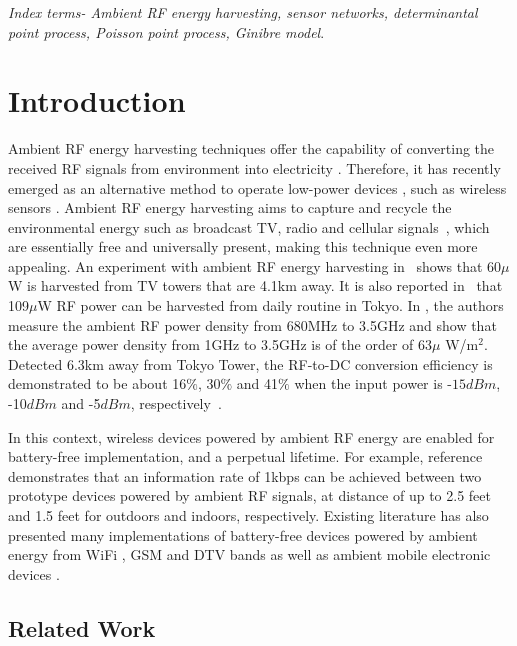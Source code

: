 \documentclass[12pt,draftclsnofoot,onecolumn]{IEEEtran}
\begin{document}
\emph{Index terms- Ambient RF energy harvesting, sensor networks, determinantal point process, Poisson point process, Ginibre model}. 


\section{Introduction}


  
 
Ambient RF energy harvesting techniques offer the capability of converting the received RF signals from environment into electricity \cite{X.2014Lu,XLuSurvey}.  Therefore, it has recently emerged as an alternative method to operate low-power devices \cite{Popovic2013,X.Lu2014}, such as wireless sensors \cite{NParks}. Ambient RF energy harvesting aims to capture and recycle the environmental energy such as broadcast TV, radio and cellular signals~\cite{X.Lu2015}, which are essentially free and universally present, making this technique even more appealing. An experiment with ambient RF energy harvesting in~\cite{A2009Sample} shows that 60$\mu$W is harvested from TV towers that are 4.1km away. It is also reported in~\cite{M2008Tentzeris} that 109$\mu$W RF power can be harvested from daily routine in Tokyo. In \cite{D2010Bouchouicha}, the authors measure the ambient RF power density from 680MHz to 3.5GHz and show that the average power density from 1GHz to 3.5GHz is of the order of 63$\mu$ W/m$^{2}$. Detected 6.3km away from Tokyo Tower, the RF-to-DC conversion efficiency is demonstrated to be about 16$\%$, 30$\%$ and 41$\%$ when the input power is -$15dBm$, -10$dBm$ and -5$dBm$, respectively~\cite{R2003Shigeta}. 

In this context, wireless devices powered by ambient RF energy are enabled for battery-free implementation, and a perpetual lifetime.
For example, reference~\cite{V2013Liu} demonstrates that an information rate of 1kbps can be achieved between two prototype devices powered by ambient RF signals, at distance of up to 2.5 feet and 1.5 feet for outdoors and indoors, respectively. Existing literature has also presented many implementations of battery-free devices powered by ambient energy from WiFi \cite{U2012Olgun}, GSM \cite{M2013Pinuela} and DTV bands  \cite{P2013Nintanavongsa} as well as ambient mobile electronic devices \cite{G2011Karthik}.

\subsection{Related Work}
\label{sec:related}
\end{document}
